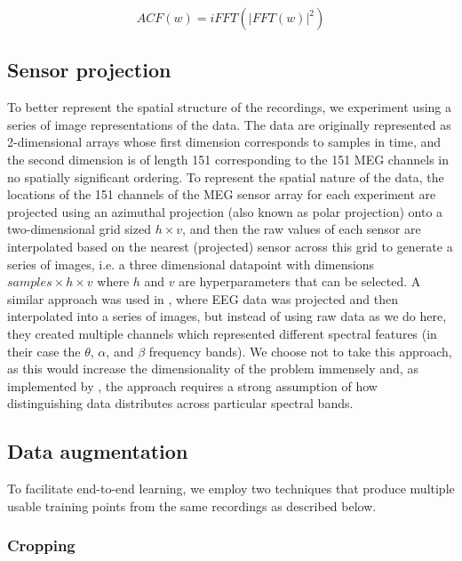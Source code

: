 \documentclass[utf8]{frontiersSCNS} %
\begin{document}

\begin{equation}
  ACF(w) = iFFT(|FFT(w)|^2)
  \label{eq1}
\end{equation}

\subsection{Sensor projection}\label{sec:sens_proj}

To better represent the spatial structure of the recordings, we experiment using a series of image representations of the data. The data are originally represented as 2-dimensional arrays whose first dimension corresponds to samples in time, and the second dimension is of length 151 corresponding to the 151 MEG channels in no spatially significant ordering. To represent the spatial nature of the data, the locations of the 151 channels of the MEG sensor array for each experiment are projected using an azimuthal projection (also known as polar projection) onto a two-dimensional grid sized $h \times v$, and then the raw values of each sensor are  interpolated based on the nearest (projected) sensor across this grid to generate a series of images, i.e. a three dimensional datapoint with dimensions $samples \times  h \times v$ where $h$ and $v$ are hyperparameters that can be selected. A similar approach was used in \cite{Bashivan2016}, where EEG data was projected and then interpolated into a series of images, but instead of using raw data as we do here, they created multiple channels which represented different spectral features (in their case the $\theta$, $\alpha$, and $\beta$ frequency bands). We choose not to take this approach, as this would increase the dimensionality of the problem immensely and, as implemented by \cite{Bashivan2016}, the approach requires a strong assumption of how distinguishing data distributes across particular spectral bands.

\subsection{Data augmentation}

To facilitate end-to-end learning, we employ two techniques that produce multiple usable training points from the same recordings as described below. 

\subsubsection{Cropping}
\end{document}
